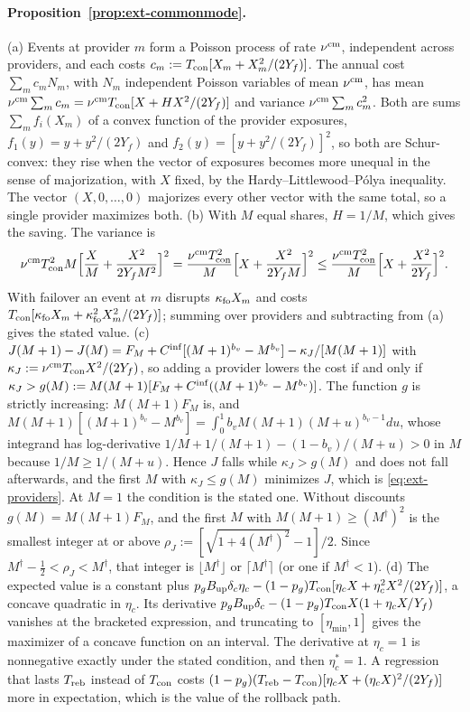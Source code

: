 \paragraph{Proposition~\ref{prop:ext-commonmode}.} (a) Events at provider $m$ form a Poisson process of rate $\nu^{\rm cm}$, independent across providers, and each costs $c_m:=T_{\rm con}[X_m+X_m^2/(2Y_f)]$. The annual cost $\sum_mc_mN_m$, with $N_m$ independent Poisson variables of mean $\nu^{\rm cm}$, has mean $\nu^{\rm cm}\sum_mc_m=\nu^{\rm cm}T_{\rm con}[X+HX^2/(2Y_f)]$ and variance $\nu^{\rm cm}\sum_mc_m^2$. Both are sums $\sum_mf_i(X_m)$ of a convex function of the provider exposures, $f_1(y)=y+y^2/(2Y_f)$ and $f_2(y)=[y+y^2/(2Y_f)]^2$, so both are Schur-convex: they rise when the vector of exposures becomes more unequal in the sense of majorization, with $X$ fixed, by the Hardy--Littlewood--P\'olya inequality. The vector $(X,0,\dots,0)$ majorizes every other vector with the same total, so a single provider maximizes both.
(b) With $M$ equal shares, $H=1/M$, which gives the saving. The variance is
\[
\nu^{\rm cm}T_{\rm con}^2M\Bigl[\frac XM+\frac{X^2}{2Y_fM^2}\Bigr]^2=\frac{\nu^{\rm cm}T_{\rm con}^2}M\Bigl[X+\frac{X^2}{2Y_fM}\Bigr]^2\le\frac{\nu^{\rm cm}T_{\rm con}^2}M\Bigl[X+\frac{X^2}{2Y_f}\Bigr]^2.
\] With failover an event at $m$ disrupts $\kappa_{\rm fo}X_m$ and costs $T_{\rm con}[\kappa_{\rm fo}X_m+\kappa_{\rm fo}^2X_m^2/(2Y_f)]$; summing over providers and subtracting from (a) gives the stated value.
(c) $J(M+1)-J(M)=F_M+C^{\rm inf}[(M+1)^{b_v}-M^{b_v}]-\kappa_J/[M(M+1)]$ with $\kappa_J:=\nu^{\rm cm}T_{\rm con}X^2/(2Y_f)$, so adding a provider lowers the cost if and only if $\kappa_J>g(M):=M(M+1)[F_M+C^{\rm inf}((M+1)^{b_v}-M^{b_v})]$. The function $g$ is strictly increasing: $M(M+1)F_M$ is, and $M(M+1)[(M+1)^{b_v}-M^{b_v}]=\int_0^1b_vM(M+1)(M+u)^{b_v-1}du$, whose integrand has log-derivative $1/M+1/(M+1)-(1-b_v)/(M+u)>0$ in $M$ because $1/M\ge1/(M+u)$. Hence $J$ falls while $\kappa_J>g(M)$ and does not fall afterwards, and the first $M$ with $\kappa_J\le g(M)$ minimizes $J$, which is \eqref{eq:ext-providers}. At $M=1$ the condition is the stated one. Without discounts $g(M)=M(M+1)F_M$, and the first $M$ with $M(M+1)\ge(M^\dagger)^2$ is the smallest integer at or above $\rho_J:=[\sqrt{1+4(M^\dagger)^2}-1]/2$. Since $M^\dagger-\tfrac12<\rho_J<M^\dagger$, that integer is $\lfloor M^\dagger\rfloor$ or $\lceil M^\dagger\rceil$ (or one if $M^\dagger<1$).
(d) The expected value is a constant plus $p_gB_{\rm up}\delta_c\eta_c-(1-p_g)T_{\rm con}[\eta_cX+\eta_c^2X^2/(2Y_f)]$, a concave quadratic in $\eta_c$. Its derivative $p_gB_{\rm up}\delta_c-(1-p_g)T_{\rm con}X(1+\eta_cX/Y_f)$ vanishes at the bracketed expression, and truncating to $[\eta_{\min},1]$ gives the maximizer of a concave function on an interval. The derivative at $\eta_c=1$ is nonnegative exactly under the stated condition, and then $\eta_c^*=1$. A regression that lasts $T_{\rm reb}$ instead of $T_{\rm con}$ costs $(1-p_g)(T_{\rm reb}-T_{\rm con})[\eta_cX+(\eta_cX)^2/(2Y_f)]$ more in expectation, which is the value of the rollback path.
